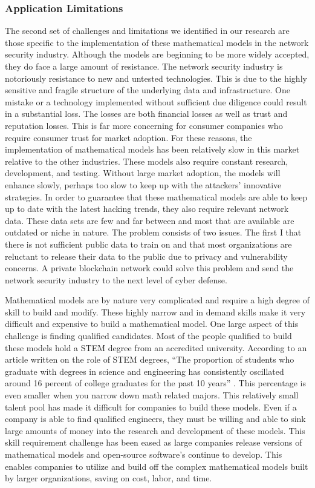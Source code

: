\documentclass{article}
\begin{document}
\subsubsection{Application Limitations}
The second set of challenges and limitations we identified in our research are those specific to the implementation of these mathematical models in the network security industry. Although the models are beginning to be more widely accepted, they do face a large amount of resistance. The network security industry is notoriously resistance to new and untested technologies. This is due to the highly sensitive and fragile structure of the underlying data and infrastructure. One mistake or a technology implemented without sufficient due diligence could result in a substantial loss. The losses are both financial losses as well as trust and reputation losses. This is far more concerning for consumer companies who require consumer trust for market adoption. For these reasons, the implementation of mathematical models has been relatively slow in this market relative to the other industries. These models also require constant research, development, and testing. Without large market adoption, the models will enhance slowly, perhaps too slow to keep up with the attackers’ innovative strategies. In order to guarantee that these mathematical models are able to keep up to date with the latest hacking trends, they also require relevant network data. These data sets are few and far between and most that are available are outdated or niche in nature. The problem consists of two issues. The first I that there is not sufficient public data to train on and that most organizations are reluctant to release their data to the public due to privacy and vulnerability concerns. A private blockchain network could solve this problem and send the network security industry to the next level of cyber defense. 

Mathematical models are by nature very complicated and require a high degree of skill to build and modify. These highly narrow and in demand skills make it very difficult and expensive to build a mathematical model. One large aspect of this challenge is finding qualified candidates. Most of the people qualified to build these models hold a STEM degree from an accredited university. According to an article written on the role of STEM degrees, “The proportion of students who graduate with degrees in science and engineering has consistently oscillated around 16 percent of college graduates for the past 10 years” \cite{bottia2018boosting}. This percentage is even smaller when you narrow down math related majors. This relatively small talent pool has made it difficult for companies to build these models. Even if a company is able to find qualified engineers, they must be willing and able to sink large amounts of money into the research and development of these models. This skill requirement challenge has been eased as large companies release versions of mathematical models and open-source software’s continue to develop. This enables companies to utilize and build off the complex mathematical models built by larger organizations, saving on cost, labor, and time. 
\end{document}
